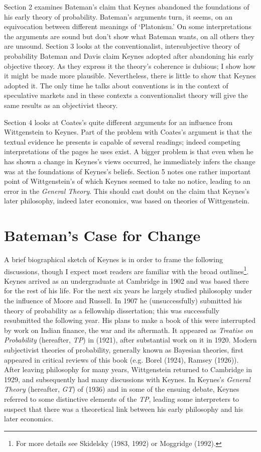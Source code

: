 \documentclass[noflushend]{philosophersimprint}
\begin{document}
Section 2 examines Bateman's claim that Keynes abandoned the foundations
of his early theory of probability. Bateman's arguments turn, it seems,
on an equivocation between different meanings of `Platonism.' On some
interpretations the arguments are sound but don't show what Bateman
wants, on all others they are unsound. Section 3 looks at the
conventionalist, intersubjective theory of probability Bateman and Davis
claim Keynes adopted after abandoning his early objective theory. As
they express it the theory's coherence is dubious; I show how it might
be made more plausible. Nevertheless, there is little to show that
Keynes adopted it. The only time he talks about conventions is in the
context of speculative markets and in these contexts a conventionalist
theory will give the same results as an objectivist theory.

Section 4 looks at Coates's quite different arguments for an influence
from Wittgenstein to Keynes. Part of the problem with Coates's argument
is that the textual evidence he presents is capable of several readings;
indeed competing interpretations of the pages he uses exist. A bigger
problem is that even when he has shown a change in Keynes's views
occurred, he immediately infers the change was at the foundations of
Keynes's beliefs. Section 5 notes one rather important point of
Wittgenstein's of which Keynes seemed to take no notice, leading to an
error in the \emph{General Theory}. This should cast doubt on the claim
that Keynes's later philosophy, indeed later economics, was based on
theories of Wittgenstein.

\hypertarget{batemans-case-for-change}{%
\section{Bateman's Case for Change}\label{batemans-case-for-change}}

A brief biographical sketch of Keynes is in order to frame the following
discussions, though I expect most readers are familiar with the broad
outlines\footnote{For more details see Skidelsky (1983, 1992) or
  Moggridge (1992).}. Keynes arrived as an undergraduate at Cambridge in
1902 and was based there for the rest of his life. For the next six
years he largely studied philosophy under the influence of Moore and
Russell. In 1907 he (unsuccessfully) submitted his theory of probability
as a fellowship dissertation; this was successfully resubmitted the
following year. His plans to make a book of this were interrupted by
work on Indian finance, the war and its aftermath. It appeared as
\emph{Treatise on Probability} (hereafter, \emph{TP}) in (1921), after
substantial work on it in 1920. Modern subjectivist theories of
probability, generally known as Bayesian theories, first appeared in
critical reviews of this book (e.g. Borel (1924), Ramsey (1926)). After
leaving philosophy for many years, Wittgenstein returned to Cambridge in
1929, and subsequently had many discussions with Keynes. In Keynes's
\emph{General Theory} (hereafter, \emph{GT}) of (1936) and in some of
the ensuing debate, Keynes referred to some distinctive elements of the
\emph{TP}, leading some interpreters to suspect that there was a
theoretical link between his early philosophy and his later economics.
\end{document}

